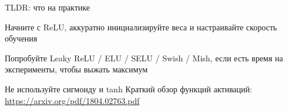 \documentclass[notes,12pt, aspectratio=169]{beamer}
\newenvironment{wideitemize}{\itemize\addtolength{\itemsep}{10pt}}{\enditemize}
\begin{document}
%
%
%
%
%
%
%
%
%
%


\begin{frame}{ TLDR: что на практике}
	\begin{wideitemize}
		\item Начните с ReLU, аккуратно инициализируйте веса и настраивайте скорость обучения
		\item Попробуйте Leaky ReLU / ELU / SELU / Swish / Mish, если есть время на эксперименты, чтобы выжать максимум
		\item Не используйте сигмоиду и  tanh
	\end{wideitemize}
\vfill %
\footnotesize
Краткий обзор функций активаций: {\color{blue}  \url{https://arxiv.org/pdf/1804.02763.pdf}}
\end{frame}
\end{document}

